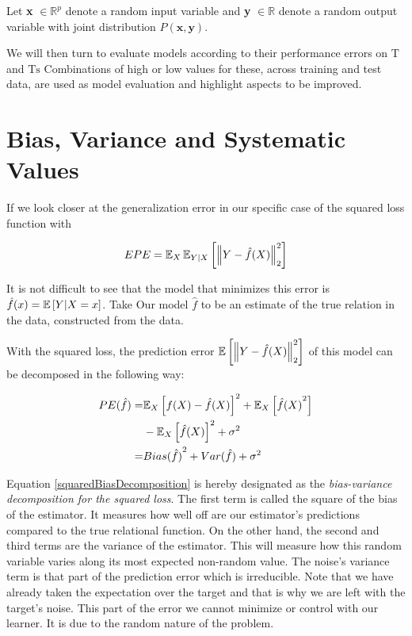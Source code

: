 Let \textbf{x} $\in \mathbb{R}^{p}$ denote a random input variable and \textbf{y} $\in \mathbb{R}$ denote a random output variable with joint distribution $P\left(\textbf{x},\textbf{y}\right)$.

We will then turn to evaluate models according to their performance errors on $\mathrm{T}$ and $\mathrm{Ts}$ Combinations of high or low values for these, across training and test data, are used as model evaluation and highlight aspects to be improved.

\section{Bias, Variance and Systematic Values}\label{subsection-biasVariance}	If we look closer at the generalization error in our specific case of the squared loss function with

\begin{equation}\label{squaredPE}
EPE = \operatorname{\mathbb{E}}_X \operatorname{\mathbb{E}}_{Y|X} \left[ \left\Vert Y - \hat{f}(X) \right\Vert_2^2 \right]
\end{equation}

It is not difficult to see that the model that minimizes this error is $\hat{f}(x) = \operatorname{\mathbb{E}} \left[ Y | X=x \right] $. Take Our model $\hat{f}$ to be an estimate of the true relation in the data, constructed from the data.

With the squared loss, the prediction error $\operatorname{\mathbb{E}} \left[ \left\Vert Y - \hat{f}(X) \right\Vert_2^2 \right]$ of this model can be decomposed in the following way:

\begin{equation}\label{squaredBiasDecomposition}
\begin{split}
PE( \hat{f} ) = & {\operatorname{\mathbb{E}}_X \left[  f(X) - \hat{f}(X) \right]}^2 + \operatorname{\mathbb{E}}_X \left[ {\hat{f}(X)}^2 \right] \\
& - {\operatorname{\mathbb{E}}_X \left[ \hat{f}(X) \right] }^2 + \sigma^2 \\
= & {Bias(\hat{f})}^2 + Var(\hat{f}) + \sigma^2
\end{split}
\end{equation}


Equation \cref{squaredBiasDecomposition} is hereby designated as the \textit{bias-variance decomposition for the squared loss}. The first term is called the square of the bias of the estimator. It measures how well off are our estimator's predictions compared to the true relational function. On the other hand, the second and third terms are the variance of the estimator. This will measure how this random variable varies along its most expected non-random value. The noise's variance term is that part of the prediction error which is irreducible. Note that we have already taken the expectation over the target and that is why we are left with the target's noise. This part of the error we cannot minimize or control with our learner. It is due to the random nature of the problem.

